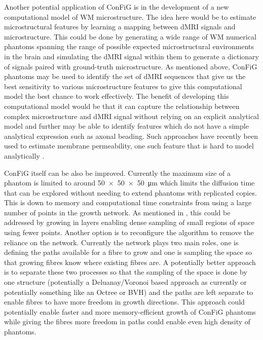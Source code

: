 Another potential application of \ac{ConFiG} is in the development of a new computational model of \ac{WM} microstructure.
The idea here would be to estimate microstructural features by learning a mapping between \ac{dMRI} signals and microstructure.
This could be done by generating a wide range of \ac{WM} numerical phantoms spanning the range of possible expected microstructural environments in the brain and simulating the \ac{dMRI} signal within them to generate a dictionary of signals paired with ground-truth microstructure.
As mentioned above, \ac{ConFiG} phantoms may be used to identify the set of \ac{dMRI} sequences that give us the best sensitivity to various microstructure features to give this computational model the best chance to work effectively.
The benefit of developing this computational model would be that it can capture the relationship between complex microstructure and \ac{dMRI} signal without relying on an explicit analytical model and further may be able to identify features which do not have a simple analytical expression such as axonal beading.
Such approaches have recently been used to estimate membrane permeability, one such feature that is hard to model analytically \cite{Hill2019,Nedjati-Gilani2017}.

\ac{ConFiG} itself can be also be improved. Currently the maximum size of a phantom is limited to around \SI{50 x 50 x 50}{\micro\metre} which limits the diffusion time that can be explored without needing to extend phantoms with replicated copies. This is down to memory and computational time constraints from using a large number of points in the growth network.
As mentioned in , this could be addressed by growing in layers enabling dense sampling of small regions of space using fewer points.
Another option is to reconfigure the algorithm to remove the reliance on the network.
Currently the network plays two main roles, one is defining the paths available for a fibre to grow and one is sampling the space so that growing fibres know where existing fibres are.
A potentially better approach is to separate these two processes so that the sampling of the space is done by one structure (potentially a Deluanay/Voronoi based approach as currently or potentially something like an Octree or \ac{BVH}\cite{ericsonRealTimeCollisionDetection2004}) and the paths are left separate to enable fibres to have more freedom in growth directions.
This approach could potentially enable faster and more memory-efficient growth of \ac{ConFiG} phantoms while giving the fibres more freedom in paths could enable even high density of phantoms.

